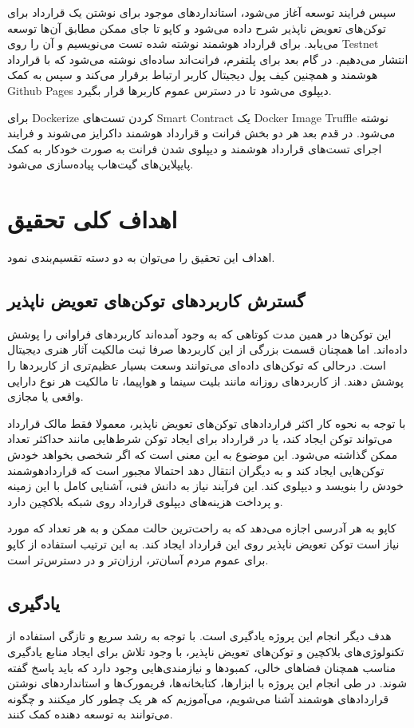 سپس فرایند توسعه آغاز می‌شود، استاندارد‌های موجود برای نوشتن یک قرارداد برای توکن‌های تعویض ناپذیر شرح داده می‌شود و کاپو تا جای ممکن مطابق آن‌ها توسعه می‌یابد. برای قرارداد هوشمند نوشته شده تست می‌نویسیم و آن را روی
\gls{Testnet}
انتشار می‌دهیم.
در گام بعد برای پلتفرم، فرانت‌اند ساده‌ای نوشته می‌شود که با قرارداد هوشمند و همچنین کیف پول دیجیتال کاربر ارتباط برقرار می‌کند و سپس به کمک
\gls{Github Pages}
دیپلوی می‌شود تا در دسترس عموم کاربرها قرار بگیرد.

برای
\gls{Dockerize}
کردن تست‌های
\gls{Smart Contract}
یک
\gls{Docker Image}
\gls{Truffle}
نوشته می‌شود. در قدم بعد هر دو بخش فرانت و قرارداد هوشمند داکرایز می‌شوند و فرایند اجرای تست‌های قرارداد هوشمند و دیپلوی شدن فرانت به صورت خودکار به کمک پایپلاین‌های گیت‌هاب پیاده‌سازی می‌شود.


\section{اهداف کلی تحقیق}
اهداف این تحقیق را می‌توان به دو دسته تقسیم‌بندی نمود.

\subsection{گسترش کاربرد‌های توکن‌های تعویض ناپذیر}
این توکن‌ها در همین مدت کوتاهی که به وجود آمده‌اند کاربردهای فراوانی را پوشش داده‌اند. اما همچنان قسمت بزرگی از این کاربردها صرفا ثبت مالکیت آثار هنری دیجیتال است. درحالی که توکن‌های داده‌ای می‌توانند وسعت بسیار عظیم‌تری از کاربردها را پوشش دهند. از کاربردهای روزانه مانند بلیت سینما و هواپیما، تا مالکیت هر نوع دارایی واقعی یا مجازی.

با توجه به نحوه کار اکثر قراردادهای توکن‌های تعویض ناپذیر، معمولا فقط مالک قرارداد می‌تواند توکن ایجاد کند، یا در قرارداد برای ایجاد توکن شرط‌هایی مانند حداکثر تعداد ممکن گذاشته می‌شود. این موضوع به این معنی است که اگر شخصی بخواهد خودش توکن‌هایی ایجاد کند و به دیگران انتقال دهد احتمالا مجبور است که قراردادهوشمند خودش را بنویسد و دیپلوی کند. این فرآیند نیاز به دانش فنی، آشنایی کامل با این زمینه و پرداخت هزینه‌های دیپلوی قرارداد روی شبکه بلاکچین دارد.

کاپو به هر آدرسی اجازه می‌دهد که به راحت‌ترین حالت ممکن و به هر تعداد که مورد نیاز است توکن تعویض ناپذیر روی این قرارداد ایجاد کند. به این ترتیب استفاده از کاپو برای عموم مردم آسان‌تر، ارزان‌تر و در دسترس‌تر است.

\subsection{یادگیری}
هدف دیگر انجام این پروژه یادگیری است. با توجه به رشد سریع و تازگی استفاده از تکنولوژی‌های بلاکچین و توکن‌های تعویض ناپذیر، با وجود تلاش برای ایجاد منابع یادگیری مناسب همچنان فضاهای خالی، کمبودها و نیازمندی‌هایی وجود دارد که باید پاسخ گفته شوند. در طی انجام این پروژه با ابزارها، کتابخانه‌ها، فریمورک‌ها و استانداردهای نوشتن قراردادهای هوشمند آشنا می‌شویم، می‌آموزیم که هر یک چطور کار میکنند و چگونه می‌توانند به توسعه دهنده کمک کنند.

